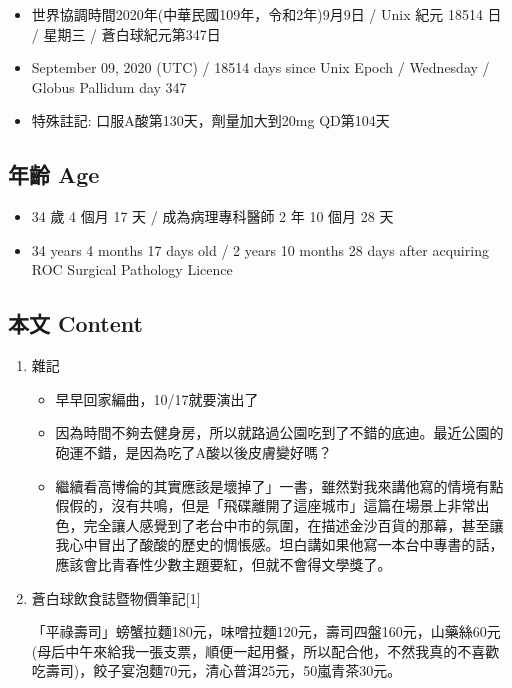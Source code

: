 \documentclass[
]{article}
\providecommand{\tightlist}{%
  \setlength{\itemsep}{0pt}\setlength{\parskip}{0pt}}
\begin{document}
\begin{itemize}
\tightlist
\item
  世界協調時間2020年(中華民國109年，令和2年)9月9日 / Unix 紀元 18514 日
  / 星期三 / 蒼白球紀元第347日
\item
  September 09, 2020 (UTC) / 18514 days since Unix Epoch / Wednesday /
  Globus Pallidum day 347
\item
  特殊註記: 口服A酸第130天，劑量加大到20mg QD第104天
\end{itemize}

\hypertarget{ux5e74ux9f61-age-8}{%
\subsection{年齡 Age}\label{ux5e74ux9f61-age-8}}

\begin{itemize}
\tightlist
\item
  34 歲 4 個月 17 天 / 成為病理專科醫師 2 年 10 個月 28 天
\item
  34 years 4 months 17 days old / 2 years 10 months 28 days after
  acquiring ROC Surgical Pathology Licence
\end{itemize}

\hypertarget{ux672cux6587-content-8}{%
\subsection{本文 Content}\label{ux672cux6587-content-8}}

\begin{enumerate}
\def\labelenumi{\arabic{enumi}.}
\item
  雜記

  \begin{itemize}
  \tightlist
  \item
    早早回家編曲，10/17就要演出了
  \item
    因為時間不夠去健身房，所以就路過公園吃到了不錯的底迪。最近公園的砲運不錯，是因為吃了A酸以後皮膚變好嗎？
  \item
    繼續看高博倫的其實應該是壞掉了」一書，雖然對我來講他寫的情境有點假假的，沒有共鳴，但是「飛碟離開了這座城市」這篇在場景上非常出色，完全讓人感覺到了老台中市的氛圍，在描述金沙百貨的那幕，甚至讓我心中冒出了酸酸的歷史的惆悵感。坦白講如果他寫一本台中專書的話，應該會比青春性少數主題要紅，但就不會得文學獎了。
  \end{itemize}
\item
  蒼白球飲食誌暨物價筆記{[}1{]}

  「平祿壽司」螃蟹拉麵180元，味噌拉麵120元，壽司四盤160元，山藥絲60元(母后中午來給我一張支票，順便一起用餐，所以配合他，不然我真的不喜歡吃壽司)，餃子宴泡麵70元，清心普洱25元，50嵐青茶30元。
\end{enumerate}
\end{document}
